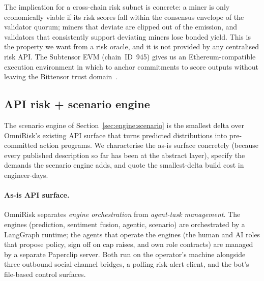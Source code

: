 \documentclass[11pt,a4paper]{article}
\begin{document}
The implication for a cross-chain risk subnet is concrete: a miner is only economically
viable if its risk scores fall within the consensus envelope of the validator quorum;
miners that deviate are clipped out of the emission, and validators that consistently
support deviating miners lose bonded yield. This is the property we want from a risk
oracle, and it is not provided by any centralised risk API. The Subtensor EVM
(chain~ID~945) gives us an Ethereum-compatible execution environment in which to anchor
commitments to score outputs without leaving the Bittensor trust
domain~\cite{opentensor2024evm}.

\subsection{API risk + scenario engine}\label{sec:arch:scenario}

The scenario engine of Section~\ref{sec:engine:scenario} is the smallest delta over
OmniRisk's existing API surface that turns predicted distributions into pre-committed
action programs. We characterise the as-is surface concretely (because every published
description so far has been at the abstract layer), specify the demands the scenario
engine adds, and quote the smallest-delta build cost in engineer-days.

\paragraph{As-is API surface.} OmniRisk separates \emph{engine orchestration}
from \emph{agent-task management}. The engines (prediction, sentiment fusion,
agentic, scenario) are orchestrated by a LangGraph runtime; the agents that
operate the engines (the human and AI roles that propose policy, sign off on
cap raises, and own role contracts) are managed by a separate Paperclip
server. Both run on the operator's machine alongside three outbound
social-channel bridges, a polling risk-alert client, and the bot's
file-based control surfaces.
\end{document}
